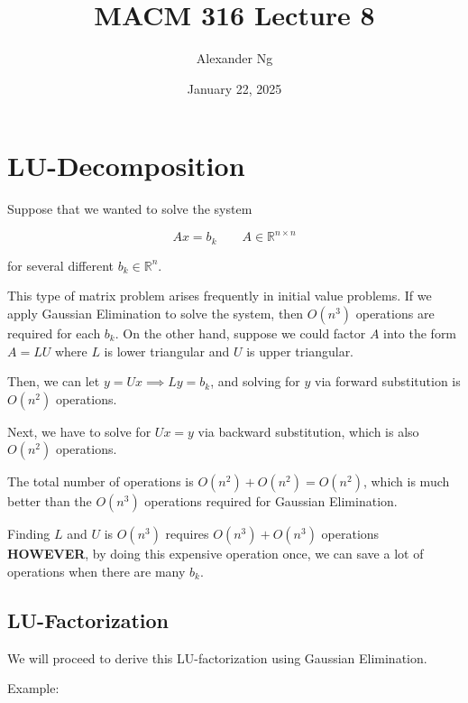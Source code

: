 \documentclass[12pt]{article}
\begin{document}
\renewcommand{\arraystretch}{1.25} %
\setlength{\arraycolsep}{12pt}

\title{MACM 316 Lecture 8}
\author{Alexander Ng}
\date{January 22, 2025}

\maketitle

\section{LU-Decomposition}

Suppose that we wanted to solve the system

\begin{equation*}
  Ax = b_k \qquad A \in \mathbb{R}^{n \times n}
\end{equation*}

for several different $b_k \in \mathbb{R}^n$. 

This type of matrix problem arises frequently in initial value problems. If we
apply Gaussian Elimination to solve the system, then $O(n^3)$ operations are
required for each $b_k$. On the other hand, suppose we could factor $A$ into
the form $A = LU$ where $L$ is lower triangular and $U$ is upper triangular.

Then, we can let $y=Ux\implies Ly = b_k$, and solving for $y$ via forward
substitution is $O(n^2)$ operations.

Next, we have to solve for $Ux=y$ via backward substitution, which is also 
$O(n^2)$ operations.

The total number of operations is $O(n^2) + O(n^2) = O(n^2)$, which is much
better than the $O(n^3)$ operations required for Gaussian Elimination.

Finding $L$ and $U$ is $O(n^3)$ requires $O(n^3) + O(n^3)$ operations
\textbf{HOWEVER}, by doing this expensive operation once, we can save a lot of
operations when there are many $b_k$.

\subsection{LU-Factorization}

We will proceed to derive this LU-factorization using Gaussian Elimination.

Example:
\end{document}
